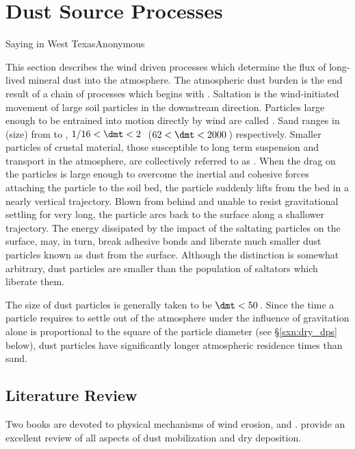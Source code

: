 \documentclass[12pt,twoside]{book}
\begin{document}
\chapter[Dust Source Processes]{Dust Source Processes}\label{sxn:mbl}
{}{Saying in West Texas}{Anonymous} 

This section describes the wind driven processes which determine
the flux of long-lived mineral dust into the atmosphere.
The atmospheric dust burden is the end result of a chain of processes
which begins with .
Saltation is the wind-initiated movement of large soil particles in
the downstream direction.
Particles large enough to be entrained into motion directly by wind
are called .
Sand ranges in  (size) from  to
, $1/16 < \dmt < 2$\,\mm\ ($62 < \dmt < 2000$\,\um) 
respectively. 
Smaller particles of crustal material, those susceptible to long term
suspension and transport in the atmosphere, are collectively referred
to as .
When the drag on the particles is large enough to overcome the
inertial and cohesive forces attaching the particle to the soil bed,
the particle suddenly lifts from the bed in a nearly vertical
trajectory.
Blown from behind and unable to resist gravitational settling for very
long, the particle arcs back to the surface along a shallower
trajectory.  
The energy dissipated by the impact of the saltating particles on the
surface, may, in turn, break adhesive bonds and liberate much smaller
dust particles known as dust from the surface.
Although the distinction is somewhat arbitrary, dust particles are
smaller than the population of saltators which liberate them. 

The size of dust particles is generally taken to be $\dmt < 50$\,\um.
Since the time a particle requires to settle out of the atmosphere
under the influence of gravitation alone is proportional to the square
of the particle diameter (see \S\ref{sxn:dry_dps} below), dust
particles have significantly longer atmospheric residence times than
sand.

\section{Literature Review}\label{mbl_ltr}
Two books are devoted to physical mechanisms of wind erosion, 
\cite{Bag41} and \cite{Sha00}.
\cite{RaL04} provide an excellent review of all aspects of dust
mobilization and dry deposition.
\end{document}
